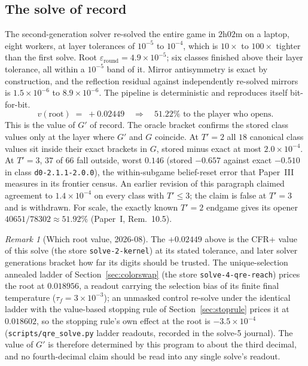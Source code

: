 \documentclass[11pt]{article}
\theoremstyle{plain}
\theoremstyle{definition}
\theoremstyle{remark}
\newtheorem{remark}[theorem]{Remark}
\newcommand{\code}[1]{\texttt{\small #1}}
\newcommand{\game}{\ensuremath{G}}
\newcommand{\gp}{\ensuremath{G'}}
\begin{document}
\subsection{The solve of record}\label{sec:solve2}

The second-generation solver re-solved the entire game in $2$h$02$m on
a laptop, eight workers, at layer tolerances of $10^{-5}$ to $10^{-4}$,
which is $10\times$ to $100\times$ tighter than the first solve. Root
$\varepsilon_{\text{round}} = 4.9\times10^{-5}$; six classes finished
above their layer tolerance, all within a $10^{-5}$ band of it. Mirror
antisymmetry is exact by construction, and the reflection residual
against independently re-solved mirrors is $1.5\times10^{-6}$ to
$8.9\times10^{-6}$. The pipeline is deterministic and reproduces itself
bit-for-bit.
\[
  v(\text{root}) \;=\; +0.02449 \quad\Longrightarrow\quad
  \mathbf{51.22\%} \text{ to the player who opens.}
\]
This is the value of $\gp$ of record. The oracle bracket confirms the
stored class values only at the layer where $\gp$ and $\game$
coincide. At $T'=2$ all $18$ canonical class values sit inside their
exact brackets in $\game$, stored minus exact at most
$2.0\times10^{-4}$. At $T'=3$, $37$ of $66$ fall outside, worst $0.146$
(stored $-0.657$ against exact $-0.510$ in class
\code{d0-2.1.1-2.0.0}), the within-subgame belief-reset error that
Paper~III measures in its frontier census. An earlier revision of this
paragraph claimed agreement to $1.4\times10^{-4}$ on every class with
$T'\le3$; the claim is false at $T'=3$ and is withdrawn. For scale, the exactly known $T'=2$ endgame gives
its opener $40651/78302\approx51.92\%$ (Paper~I, Rem.~10.5).

\begin{remark}[Which root value, 2026-08]\label{rem:rootvalue}
The $+0.02449$ above is the CFR+ value of this solve (the store
\code{solve-2-kernel}) at its stated tolerance, and later solver
generations bracket how far its digits should be trusted. The
unique-selection annealed ladder of Section~\ref{sec:colorswap}
(the store \code{solve-4-qre-reach}) prices the root at $0.018956$,
a readout carrying the selection bias of its finite final temperature
($\tau_f=3\times10^{-3}$); an unmasked control re-solve under the
identical ladder with the value-based stopping rule of
Section~\ref{sec:stoprule} prices it at $0.018602$, so the stopping
rule's own effect at the root is $-3.5\times10^{-4}$
(\code{scripts/qre\_solve.py} ladder readouts, recorded in the
solve-5 journal). The value of $\gp$ is therefore determined by this
program to about the third decimal, and no fourth-decimal claim
should be read into any single solve's readout.
\end{remark}
\end{document}
